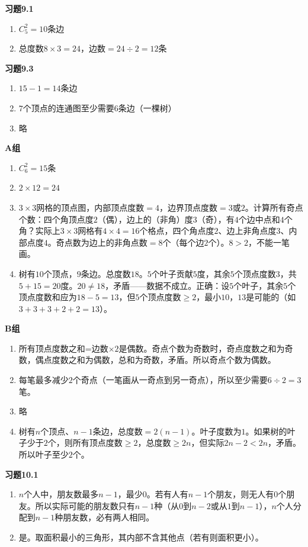 
\textbf{习题9.1}
\begin{enumerate}
\item $C_5^2=10$条边
\item 总度数$8\times3=24$，边数$=24\div2=12$条
\end{enumerate}

\textbf{习题9.3}
\begin{enumerate}
\item $15-1=14$条边
\item $7$个顶点的连通图至少需要$6$条边（一棵树）
\item 略
\end{enumerate}

\textbf{A组}
\begin{enumerate}
\item $C_6^2=15$条
\item $2\times12=24$
\item $3\times3$网格的顶点图，内部顶点度数$=4$，边界顶点度数$=3$或$2$。计算所有奇点个数：四个角顶点度$2$（偶），边上的（非角）度$3$（奇），有$4$个边中点和$4$个角？实际上$3\times3$网格有$4\times4=16$个格点，四个角点度$2$、边上非角点度$3$、内部点度$4$。奇点数为边上的非角点数$=8$个（每个边$2$个）。$8>2$，不能一笔画。
\item 树有$10$个顶点，$9$条边。总度数$18$。$5$个叶子贡献$5$度，其余$5$个顶点度数$3$，共$5+15=20$度。$20\neq18$，矛盾——数据不成立。正确：设$5$个叶子，其余$5$个顶点度数和应为$18-5=13$，但$5$个顶点度数$\ge2$，最小$10$，$13$是可能的（如$3+3+3+2+2=13$）。
\end{enumerate}

\textbf{B组}
\begin{enumerate}
\item 所有顶点度数之和=边数$\times2$是偶数。奇点个数为奇数时，奇点度数之和为奇数，偶点度数之和为偶数，总和为奇数，矛盾。所以奇点个数为偶数。
\item 每笔最多减少$2$个奇点（一笔画从一奇点到另一奇点），所以至少需要$6\div2=3$笔。
\item 略
\item 树有$n$个顶点、$n-1$条边，总度数$=2(n-1)$。叶子度数为$1$。如果树的叶子少于$2$个，则所有顶点度数$\ge2$，总度数$\ge2n$，但实际$2n-2<2n$，矛盾。所以叶子至少$2$个。
\end{enumerate}


\textbf{习题10.1}
\begin{enumerate}
\item $n$个人中，朋友数最多$n-1$，最少$0$。若有人有$n-1$个朋友，则无人有$0$个朋友。所以实际可能的朋友数只有$n-1$种（从$0$到$n-2$或从$1$到$n-1$），$n$个人分配到$n-1$种朋友数，必有两人相同。
\item 是。取面积最小的三角形，其内部不含其他点（若有则面积更小）。
\end{enumerate}

